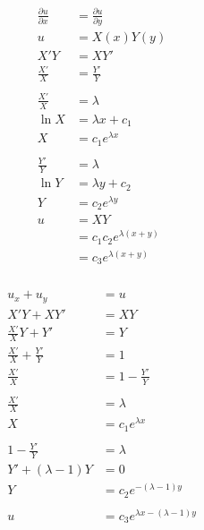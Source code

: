\documentclass{article}
\begin{document}
\begin{align*}
  \frac{\partial u}{\partial x} & = \frac{\partial u}{\partial y} \\
  u                             & = X(x) Y(y)                     \\
  X' Y                          & = X Y'                          \\
  \frac{X'}{X}                  & = \frac{Y'}{Y}                  \\ \\
  \frac{X'}{X}                  & = \lambda                       \\
  \ln X                         & = \lambda x + c_1               \\
  X                             & = c_1 e^{\lambda x}             \\ \\
  \frac{Y'}{Y}                  & = \lambda                       \\
  \ln Y                         & = \lambda y + c_2               \\
  Y                             & = c_2 e^{\lambda y}             \\
  u                             & = X Y                           \\
                                & = c_1 c_2 e^{\lambda (x + y)}   \\
                                & = c_3 e^{\lambda (x + y)}
\end{align*}

\setcounter{subsubsection}{2}
\subsubsection{}

\begin{align*}
  u_x + u_y                   & = u                                   \\
  X' Y + X Y'                 & = X Y                                 \\
  \frac{X'}{X} Y + Y'         & = Y                                   \\
  \frac{X'}{X} + \frac{Y'}{Y} & = 1                                   \\
  \frac{X'}{X}                & = 1 - \frac{Y'}{Y}                    \\ \\
  \frac{X'}{X}                & = \lambda                             \\
  X                           & = c_1 e^{\lambda x}                   \\ \\
  1 - \frac{Y'}{Y}            & = \lambda                             \\
  Y' + (\lambda - 1) Y        & = 0                                   \\
  Y                           & = c_2 e^{-(\lambda - 1) y}            \\ \\
  u                           & = c_3 e^{\lambda x - (\lambda - 1) y}
\end{align*}
\end{document}
